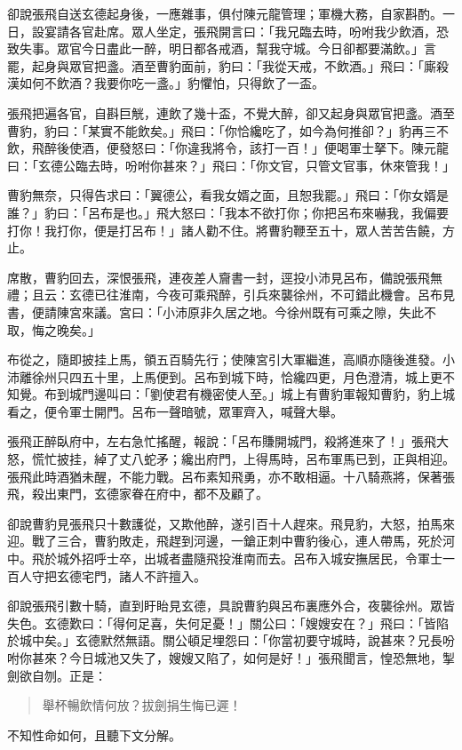 卻說張飛自送玄德起身後，一應雜事，俱付陳元龍管理；軍機大務，自家斟酌。一日，設宴請各官赴席。眾人坐定，張飛開言曰：「我兄臨去時，吩咐我少飲酒，恐致失事。眾官今日盡此一醉，明日都各戒酒，幫我守城。今日卻都要滿飲。」言罷，起身與眾官把盞。酒至曹豹面前，豹曰：「我從天戒，不飲酒。」飛曰：「廝殺漢如何不飲酒？我要你吃一盞。」豹懼怕，只得飲了一盃。

張飛把遍各官，自斟巨觥，連飲了幾十盃，不覺大醉，卻又起身與眾官把盞。酒至曹豹，豹曰：「某實不能飲矣。」飛曰：「你恰纔吃了，如今為何推卻？」豹再三不飲，飛醉後使酒，便發怒曰：「你違我將令，該打一百！」便喝軍士拏下。陳元龍曰：「玄德公臨去時，吩咐你甚來？」飛曰：「你文官，只管文官事，休來管我！」

曹豹無奈，只得告求曰：「翼德公，看我女婿之面，且恕我罷。」飛曰：「你女婿是誰？」豹曰：「呂布是也。」飛大怒曰：「我本不欲打你；你把呂布來嚇我，我偏要打你！我打你，便是打呂布！」諸人勸不住。將曹豹鞭至五十，眾人苦苦告饒，方止。

席散，曹豹回去，深恨張飛，連夜差人齎書一封，逕投小沛見呂布，備說張飛無禮；且云：玄德已往淮南，今夜可乘飛醉，引兵來襲徐州，不可錯此機會。呂布見書，便請陳宮來議。宮曰：「小沛原非久居之地。今徐州既有可乘之隙，失此不取，悔之晚矣。」

布從之，隨即披挂上馬，領五百騎先行；使陳宮引大軍繼進，高順亦隨後進發。小沛離徐州只四五十里，上馬便到。呂布到城下時，恰纔四更，月色澄清，城上更不知覺。布到城門邊叫曰：「劉使君有機密使人至。」城上有曹豹軍報知曹豹，豹上城看之，便令軍士開門。呂布一聲暗號，眾軍齊入，喊聲大舉。

張飛正醉臥府中，左右急忙搖醒，報說：「呂布賺開城門，殺將進來了！」張飛大怒，慌忙披挂，綽了丈八蛇矛；纔出府門，上得馬時，呂布軍馬已到，正與相迎。張飛此時酒猶未醒，不能力戰。呂布素知飛勇，亦不敢相逼。十八騎燕將，保著張飛，殺出東門，玄德家眷在府中，都不及顧了。

卻說曹豹見張飛只十數護從，又欺他醉，遂引百十人趕來。飛見豹，大怒，拍馬來迎。戰了三合，曹豹敗走，飛趕到河邊，一鎗正刺中曹豹後心，連人帶馬，死於河中。飛於城外招呼士卒，出城者盡隨飛投淮南而去。呂布入城安撫居民，令軍士一百人守把玄德宅門，諸人不許擅入。

卻說張飛引數十騎，直到盱眙見玄德，具說曹豹與呂布裏應外合，夜襲徐州。眾皆失色。玄德歎曰：「得何足喜，失何足憂！」關公曰：「嫂嫂安在？」飛曰：「皆陷於城中矣。」玄德默然無語。關公頓足埋怨曰：「你當初要守城時，說甚來？兄長吩咐你甚來？今日城池又失了，嫂嫂又陷了，如何是好！」張飛聞言，惶恐無地，掣劍欲自刎。正是：

\begin{quote}
舉杯暢飲情何放？拔劍捐生悔已遲！
\end{quote}

不知性命如何，且聽下文分解。
